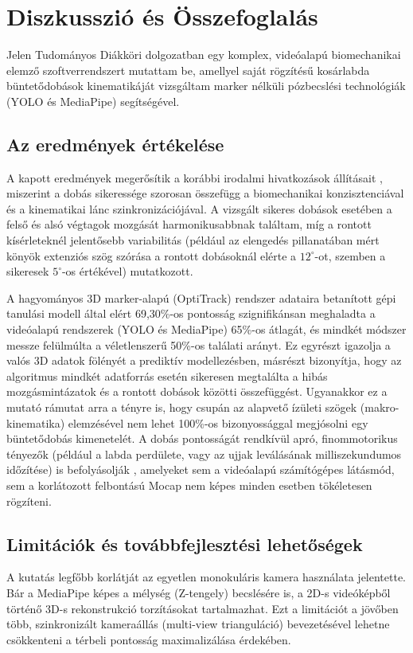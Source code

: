 \chapter{Diszkusszió és Összefoglalás}
\label{ch:osszefoglalas}

Jelen Tudományos Diákköri dolgozatban egy komplex, videóalapú biomechanikai elemző szoftverrendszert mutattam be, amellyel saját rögzítésű kosárlabda büntetődobások kinematikáját vizsgáltam marker nélküli pózbecslési technológiák (YOLO és MediaPipe) segítségével.

\section{Az eredmények értékelése}
A kapott eredmények megerősítik a korábbi irodalmi hivatkozások állításait \cite{Button2003, Robins2006}, miszerint a dobás sikeressége szorosan összefügg a biomechanikai konzisztenciával és a kinematikai lánc szinkronizációjával. A vizsgált sikeres dobások esetében a felső és alsó végtagok mozgását harmonikusabbnak találtam, míg a rontott kísérleteknél jelentősebb variabilitás (például az elengedés pillanatában mért könyök extenziós szög szórása a rontott dobásoknál elérte a $12^\circ$-ot, szemben a sikeresek $5^\circ$-os értékével) mutatkozott.

A hagyományos 3D marker-alapú (OptiTrack) rendszer adataira betanított gépi tanulási modell által elért 69,30\%-os pontosság szignifikánsan meghaladta a videóalapú rendszerek (YOLO és MediaPipe) 65\%-os átlagát, és mindkét módszer messze felülmúlta a véletlenszerű 50\%-os találati arányt. Ez egyrészt igazolja a valós 3D adatok fölényét a prediktív modellezésben, másrészt bizonyítja, hogy az algoritmus mindkét adatforrás esetén sikeresen megtalálta a hibás mozgásmintázatok és a rontott dobások közötti összefüggést. Ugyanakkor ez a mutató rámutat arra a tényre is, hogy csupán az alapvető ízületi szögek (makro-kinematika) elemzésével nem lehet 100\%-os bizonyossággal megjósolni egy büntetődobás kimenetelét. A dobás pontosságát rendkívül apró, finommotorikus tényezők (például a labda perdülete, vagy az ujjak leválásának milliszekundumos időzítése) is befolyásolják \cite{Tran2008, Okazaki2012}, amelyeket sem a videóalapú számítógépes látásmód, sem a korlátozott felbontású Mocap nem képes minden esetben tökéletesen rögzíteni.

\section{Limitációk és továbbfejlesztési lehetőségek}
A kutatás legfőbb korlátját az egyetlen monokuláris kamera használata jelentette. Bár a MediaPipe képes a mélység (Z-tengely) becslésére is, a 2D-s videóképből történő 3D-s rekonstrukció torzításokat tartalmazhat. Ezt a limitációt a jövőben több, szinkronizált kameraállás (multi-view trianguláció) bevezetésével lehetne csökkenteni a térbeli pontosság maximalizálása érdekében.

